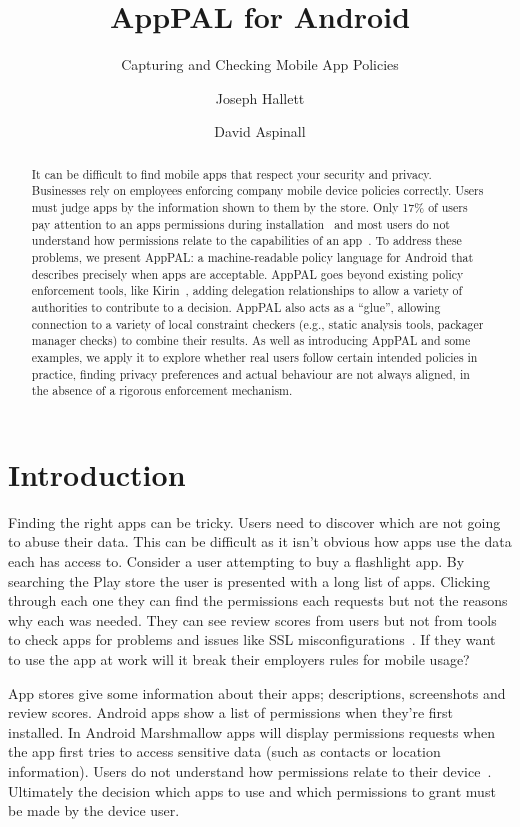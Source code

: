 \documentclass[]{llncs}
\title{AppPAL for Android}
\subtitle{Capturing and Checking Mobile App Policies}
\author{Joseph Hallett \and David Aspinall }
\institute{School of Informatics, University of Edinburgh}
\begin{document}
\maketitle{}

\begin{abstract}
  It can be difficult to find mobile apps that respect your security and privacy.
  Businesses rely on employees enforcing company mobile device policies correctly.
  Users must judge apps by the information shown to them by the store.
  Only 17\% of users pay attention to an apps permissions during installation~\cite{Felt:2012hm} and most users do not understand how permissions relate to the capabilities of an app~\cite{Kelley:2012bw}.
  To address these problems, we present AppPAL: a machine-readable policy language for Android that describes precisely when apps are acceptable.
  AppPAL goes beyond existing policy enforcement tools, like Kirin~\cite{Enck:2009ko}, adding delegation relationships to allow a variety of authorities to contribute to a decision.
  AppPAL also acts as a ``glue'', allowing connection to a variety of local constraint checkers (e.g., static analysis tools, packager manager checks) to combine their results.
  As well as introducing AppPAL and some examples, we apply it to explore whether real users follow certain intended policies in practice, finding privacy preferences and actual behaviour are not always aligned, in the absence of a rigorous enforcement mechanism.
  \end{abstract}

\section{Introduction}
\label{sec:introduction}

Finding the right apps can be tricky.
Users need to discover which are not going to abuse their data.
This can be difficult as it isn't obvious how apps use the data each has access to.
Consider a user attempting to buy a flashlight app.
By searching the Play store the user is presented with a long list of apps.
Clicking through each one they can find the permissions each requests but not the reasons why each was needed.
They can see review scores from users but not from tools to check apps for problems and issues like SSL misconfigurations~\cite{Fahl:2012dj}.
If they want to use the app at work will it break their employers rules for mobile usage?

App stores give some information about their apps; descriptions, screenshots and review scores.
Android apps show a list of permissions when they're first installed.
In Android Marshmallow apps will display permissions requests when the app first tries to access sensitive data (such as contacts or location information).
Users do not understand how permissions relate to their device~\cite{Felt:2012hm,Thompson:2013eb}.
Ultimately the decision which apps to use and which permissions to grant must be made by the device user.
\end{document}

